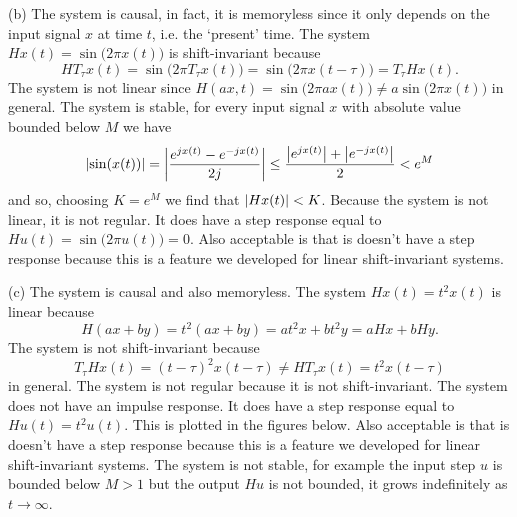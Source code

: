 \begin{excersizelist}
\begin{solution}
(b) The system is causal, in fact, it is memoryless since it only depends on the input signal $x$ at time $t$, i.e. the `present' time.  The system $Hx(t) = \sin\big(2\pi x(t)\big)$ is shift-invariant because 
 \[
 H T_\tau x(t) = \sin\big(2\pi T_\tau x(t)\big) = \sin\big(2\pi x(t-\tau)\big) = T_\tau H x(t).
 \]
 The system is not linear since $H(ax,t) = \sin\big(2\pi a x(t)\big) \neq a \sin\big(2\pi x(t)\big)$ in general.  The system is stable, for every input signal $x$ with absolute value bounded below $M$ we have
\[
\left\vert \sin(x(t)) \right\vert = \left\vert \frac{e^{jx(t)} - e^{-jx(t)}}{2j} \right\vert \leq \frac{\left\vert e^{jx(t)} \right\vert + \left\vert e^{-jx(t)} \right\vert}{2} < e^M
\] 
and so, choosing $K = e^{M}$ we find that $\left\vert Hx(t) \right\vert < K$.  Because the system is not linear, it is not regular. It does have a step response equal to $Hu(t) = \sin\big(2\pi u(t)\big) = 0$.  Also acceptable is that is doesn't have a step response because this is a feature we developed for linear shift-invariant systems.

(c) The system is causal and also memoryless.  The system $Hx(t) = t^2x(t)$ is linear because 
\[
H(ax+by) = t^2(ax+by) = at^2x + bt^2y = aH x + bHy.
\]
The system is not shift-invariant because
\[
T_\tau H x(t) = (t-\tau)^2x(t-\tau) \neq H T_\tau x(t) = t^2 x(t - \tau)
\]
in general.  The system is not regular because it is not shift-invariant.  The system does not have an impulse response.  It does have a step response equal to $Hu(t) = t^2u(t)$.  This is plotted in the figures below.  Also acceptable is that is doesn't have a step response because this is a feature we developed for linear shift-invariant systems.  The system is not stable, for example the input step $u$ is bounded below $M > 1$ but the output $Hu$ is not bounded, it grows indefinitely as $t \to \infty$.


\end{solution}
\end{excersizelist}
